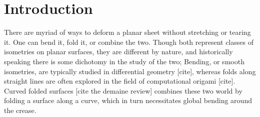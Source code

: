 \section{Introduction}
There are myriad of ways to deform a planar sheet without stretching or tearing it. One can bend it, fold it, or combine the two. Though both represent classes of isometries on planar surfaces, they are different by nature, and historically speaking there is some dichotomy in the study of the two; Bending, or smooth isometries, are typically studied in differential geometry [cite], whereas folds along straight lines are often explored in the field of computational origami [cite]. Curved folded surfaces [cite the demaine review] combines these two world by folding a surface along a curve, which in turn necessitates global bending around the crease.

